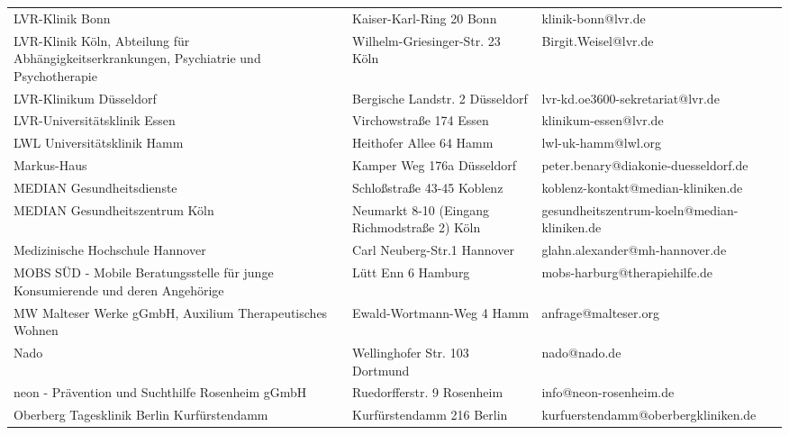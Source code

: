 {\begin{xltabular}{\textwidth} {
 >{\raggedright\arraybackslash}p{5cm}
 >{\raggedright\arraybackslash}X
 >{\raggedright\arraybackslash}p{5cm} }
LVR-Klinik Bonn & Kaiser-Karl-Ring 20 Bonn & klinik-bonn@lvr.de \\
LVR-Klinik Köln, Abteilung für Abhängigkeitserkrankungen, Psychiatrie und Psychotherapie & Wilhelm-Griesinger-Str. 23 Köln & Birgit.Weisel@lvr.de \\
LVR-Klinikum Düsseldorf & Bergische Landstr. 2 Düsseldorf & lvr-kd.oe3600-sekretariat@lvr.de \\
LVR-Universitätsklinik Essen & Virchowstraße 174 Essen & klinikum-essen@lvr.de \\
LWL Universitätsklinik Hamm & Heithofer Allee 64 Hamm & lwl-uk-hamm@lwl.org \\
Markus-Haus & Kamper Weg 176a Düsseldorf & peter.benary@diakonie-duesseldorf.de \\
MEDIAN Gesundheitsdienste & Schloßstraße 43-45 Koblenz & koblenz-kontakt@median-kliniken.de \\
MEDIAN Gesundheitszentrum Köln & Neumarkt 8-10 (Eingang Richmodstraße 2) Köln & gesundheitszentrum-koeln@median-kliniken.de \\
Medizinische Hochschule Hannover & Carl Neuberg-Str.1 Hannover & glahn.alexander@mh-hannover.de \\
MOBS SÜD - Mobile Beratungsstelle für junge Konsumierende und deren Angehörige & Lütt Enn 6 Hamburg & mobs-harburg@therapiehilfe.de \\
MW Malteser Werke gGmbH, Auxilium Therapeutisches Wohnen & Ewald-Wortmann-Weg 4 Hamm & anfrage@malteser.org \\
Nado & Wellinghofer Str. 103 Dortmund & nado@nado.de \\
neon - Prävention und Suchthilfe Rosenheim gGmbH & Ruedorfferstr. 9 Rosenheim & info@neon-rosenheim.de \\
Oberberg Tagesklinik Berlin Kurfürstendamm & Kurfürstendamm 216 Berlin & kurfuerstendamm@oberbergkliniken.de \\

\end{xltabular}}
